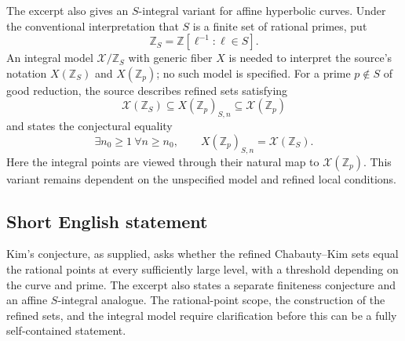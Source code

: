 \documentclass[11pt]{article}
\newcommand{\Z}{\mathbb{Z}}
\begin{document}
The excerpt also gives an \(S\)-integral variant for affine hyperbolic curves. Under the conventional interpretation that \(S\) is a finite set of rational primes, put
\[
\Z_S=\Z[\ell^{-1}:\ell\in S].
\]
An integral model \(\mathcal X/\Z_S\) with generic fiber \(X\) is needed to interpret the source's notation \(X(\Z_S)\) and \(X(\Z_p)\); no such model is specified. For a prime \(p\notin S\) of good reduction, the source describes refined sets satisfying
\[
\mathcal X(\Z_S)\subseteq X(\Z_p)_{S,n}\subseteq\mathcal X(\Z_p)
\]
and states the conjectural equality
\[
\exists n_0\geq 1\ \forall n\geq n_0,\qquad X(\Z_p)_{S,n}=\mathcal X(\Z_S).
\]
Here the integral points are viewed through their natural map to \(\mathcal X(\Z_p)\). This variant remains dependent on the unspecified model and refined local conditions.
\subsection{Short English statement}
Kim's conjecture, as supplied, asks whether the refined Chabauty--Kim sets equal the rational points at every sufficiently large level, with a threshold depending on the curve and prime. The excerpt also states a separate finiteness conjecture and an affine \(S\)-integral analogue. The rational-point scope, the construction of the refined sets, and the integral model require clarification before this can be a fully self-contained statement.
\end{document}
